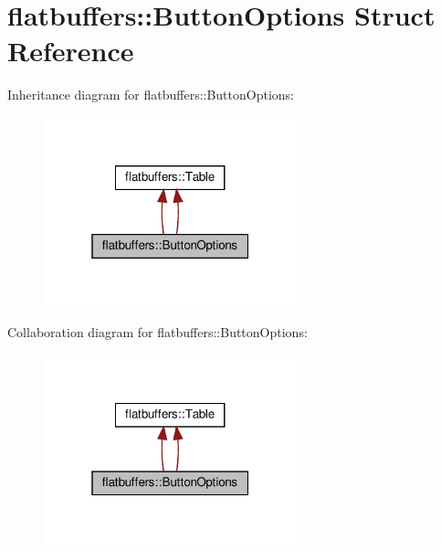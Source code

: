 \hypertarget{structflatbuffers_1_1ButtonOptions}{}\section{flatbuffers\+:\+:Button\+Options Struct Reference}
\label{structflatbuffers_1_1ButtonOptions}


Inheritance diagram for flatbuffers\+:\+:Button\+Options\+:
\nopagebreak
\begin{figure}[H]
\begin{center}
\leavevmode
\includegraphics[width=208pt]{structflatbuffers_1_1ButtonOptions__inherit__graph}
\end{center}
\end{figure}


Collaboration diagram for flatbuffers\+:\+:Button\+Options\+:
\nopagebreak
\begin{figure}[H]
\begin{center}
\leavevmode
\includegraphics[width=208pt]{structflatbuffers_1_1ButtonOptions__coll__graph}
\end{center}
\end{figure}
